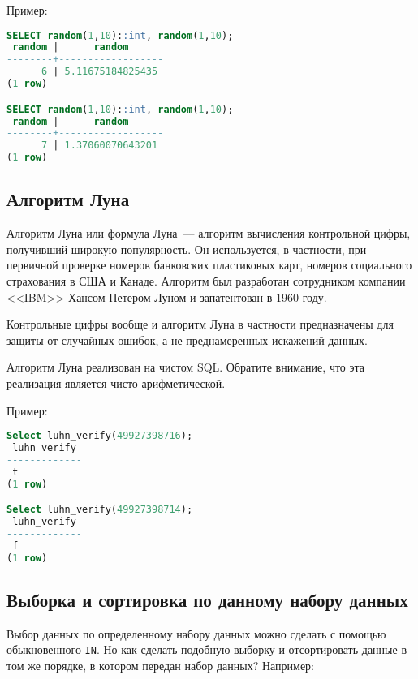 Пример:

\begin{lstlisting}[language=SQL,label=lst:snippets9,caption=Случайное число из диапазона. Пример]
SELECT random(1,10)::int, random(1,10);
 random |      random
--------+------------------
      6 | 5.11675184825435
(1 row)

SELECT random(1,10)::int, random(1,10);
 random |      random
--------+------------------
      7 | 1.37060070643201
(1 row)
\end{lstlisting}



\subsection{Алгоритм Луна}

\href{http://en.wikipedia.org/wiki/Luhn\_algorithm}{Алгоритм Луна или формула Луна}~--- алгоритм вычисления контрольной цифры, получивший широкую популярность. Он используется, в частности, при первичной проверке номеров банковских пластиковых карт, номеров социального страхования в США и Канаде. Алгоритм был разработан сотрудником компании <<IBM>> Хансом Петером Луном и запатентован в 1960 году.

Контрольные цифры вообще и алгоритм Луна в частности предназначены для защиты от случайных ошибок, а не преднамеренных искажений данных.

Алгоритм Луна реализован на чистом SQL. Обратите внимание, что эта реализация является чисто арифметической.



Пример:

\begin{lstlisting}[language=SQL,label=lst:snippets11,caption=Алгоритм Луна. Пример]
Select luhn_verify(49927398716);
 luhn_verify
-------------
 t
(1 row)

Select luhn_verify(49927398714);
 luhn_verify
-------------
 f
(1 row)

\end{lstlisting}



\subsection{Выборка и сортировка по данному набору данных}

Выбор данных по определенному набору данных можно сделать с помощью обыкновенного \lstinline!IN!. Но как сделать подобную выборку и отсортировать данные в том же порядке, в котором передан набор данных? Например:

